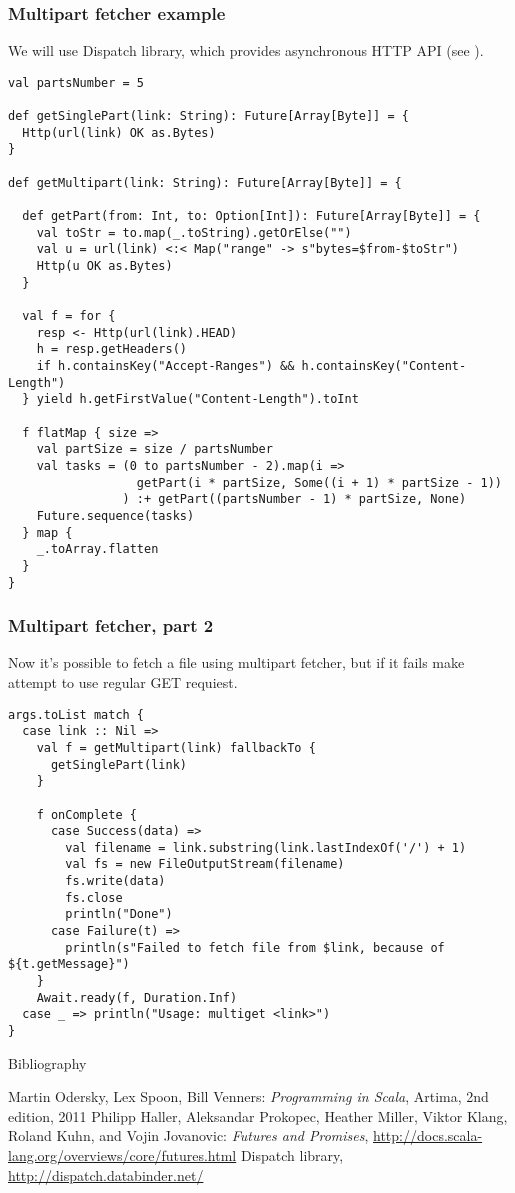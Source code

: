 \begin{frame}[fragile]
\frametitle{Multipart fetcher example}
We will use Dispatch library, which provides asynchronous HTTP API (see \cite{dispatch}).
\begin{lstlisting}[name=multifetch]
val partsNumber = 5

def getSinglePart(link: String): Future[Array[Byte]] = {
  Http(url(link) OK as.Bytes)
}

def getMultipart(link: String): Future[Array[Byte]] = {

  def getPart(from: Int, to: Option[Int]): Future[Array[Byte]] = {
    val toStr = to.map(_.toString).getOrElse("")
    val u = url(link) <:< Map("range" -> s"bytes=$from-$toStr")
    Http(u OK as.Bytes)
  }

  val f = for {
    resp <- Http(url(link).HEAD)
    h = resp.getHeaders()
    if h.containsKey("Accept-Ranges") && h.containsKey("Content-Length")
  } yield h.getFirstValue("Content-Length").toInt

  f flatMap { size =>
    val partSize = size / partsNumber
    val tasks = (0 to partsNumber - 2).map(i =>
                  getPart(i * partSize, Some((i + 1) * partSize - 1))
                ) :+ getPart((partsNumber - 1) * partSize, None)
    Future.sequence(tasks)
  } map {
    _.toArray.flatten
  }
}
\end{lstlisting}
\end{frame}

\begin{frame}[fragile]
\frametitle{Multipart fetcher, part 2}
Now it's possible to fetch a file using multipart fetcher, but if it fails make attempt to use
regular GET requiest.
\begin{lstlisting}[name=multifetch]
args.toList match {
  case link :: Nil =>
    val f = getMultipart(link) fallbackTo {
      getSinglePart(link)
    } 
    
    f onComplete {
      case Success(data) =>
        val filename = link.substring(link.lastIndexOf('/') + 1)
        val fs = new FileOutputStream(filename)
        fs.write(data)
        fs.close
        println("Done")
      case Failure(t) =>
        println(s"Failed to fetch file from $link, because of ${t.getMessage}")
    }
    Await.ready(f, Duration.Inf)
  case _ => println("Usage: multiget <link>")
}
\end{lstlisting}
\end{frame}


\begin{frame}{Bibliography}
\begin{thebibliography}{00}
Martin Odersky, Lex Spoon, Bill Venners:
\emph{Programming in Scala},
Artima, 2nd edition, 2011
Philipp Haller, Aleksandar Prokopec, Heather Miller, Viktor Klang, Roland Kuhn, and Vojin Jovanovic:
\emph{Futures and Promises}, \url{http://docs.scala-lang.org/overviews/core/futures.html}
Dispatch library, \url{http://dispatch.databinder.net/}
\end{thebibliography}
\end{frame}




